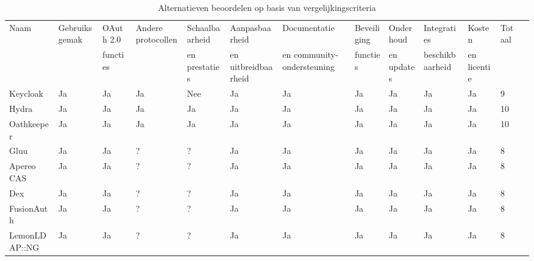 \begin{table}[htbp]
  \centering
  \caption{Alternatieven beoordelen op basis van vergelijkingscriteria}
  \label{tab:oauth_servers}
  \begin{adjustbox}{width=1\textwidth}
  \begin{tabular}{@{}lllllllllllll@{}}
    \toprule
    Naam          & Gebruiksgemak & OAuth 2.0 & Andere protocollen & Schaalbaarheid & Aanpasbaarheid & Documentatie & Beveiliging & Onderhoud & Integraties & Kosten & Totaal \\ 
                   &                & functies &                     & en prestaties   & en uitbreidbaarheid & en community-ondersteuning & functies & en updates & beschikbaarheid & en licentie &        \\
    \midrule
    Keycloak      & Ja             & Ja        & Ja                  & Nee             & Ja               & Ja             & Ja         & Ja         & Ja             & Ja          & 9      \\
    Hydra         & Ja             & Ja        & Ja                  & Ja              & Ja               & Ja             & Ja         & Ja         & Ja             & Ja          & 10      \\
    Oathkeeper & Ja            & Ja        & Ja                  & Ja              & Ja               & Ja             & Ja         & Ja         & Ja             & Ja          & 10      \\
    Gluu          & Ja             & Ja        & ?                   & ?               & Ja               & Ja             & Ja         & Ja         & Ja             & Ja          & 8      \\
    Apereo CAS    & Ja             & Ja        & ?                   & ?               & Ja               & Ja             & Ja         & Ja         & Ja             & Ja          & 8      \\
    Dex           & Ja             & Ja        & ?                   & ?               & Ja               & Ja             & Ja         & Ja         & Ja             & Ja          & 8      \\
    FusionAuth    & Ja             & Ja        & ?                   & ?               & Ja               & Ja             & Ja         & Ja         & Ja             & Ja          & 8      \\
    LemonLDAP::NG & Ja             & Ja        & ?                   & ?               & Ja               & Ja             & Ja         & Ja         & Ja             & Ja          & 8      \\

\end{tabular}
\end{adjustbox}
\end{table}
